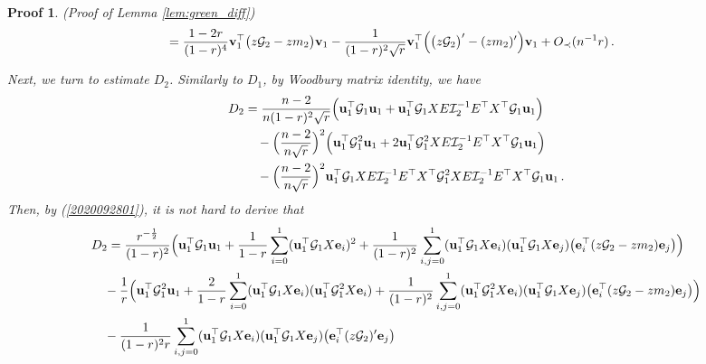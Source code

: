 \documentclass[12pt]{article}
\numberwithin{equation}{section}
\newtheorem{myPro}{Proof}
\theoremstyle{remark}
\newcommand{\1}{{\rm 1}\kern-0.24em{\rm I}}
\begin{document}
\begin{appendices}
\begin{myPro}{(Proof of Lemma \ref{lem:green_diff})}
\begin{align}
&=  \frac{1-2r}{(1-r)^4}{\bf v}_1^{\top} \big( z\mathcal{G}_2-zm_2\big){\bf v}_1
-\frac{1}{(1-r)^2\sqrt r}{\bf v}_1^{\top}\Big( \big(z\mathcal{G}_2\big)' - (zm_2)'\Big){\bf v}_1+O_\prec(n^{-1}r)\,.
\end{align}
%

Next, we turn to estimate $D_2$. Similarly to $D_1$, by Woodbury matrix identity, we have
\begin{align*}
D_2&= \frac{n-2}{n(1-r)^2\sqrt r} \Big( {\bf u}_1^{\top} \mathcal{G}_1 {\bf u}_1 + {\bf u}_1^{\top}  \mathcal{G}_1{X}{E} \mathcal{I}_2^{-1}{E}^{\top} {X}^{\top} \mathcal{G}_1 {\bf u}_1\Big) \notag\\
&\quad -\Big(\frac{n-2}{n\sqrt r}\Big)^2  \Big( {\bf u}_1^{\top}  \mathcal{G}_1^2{\bf u}_1 + 2{\bf u}_1^{\top}  \mathcal{G}_1^2{X}{E} \mathcal{I}_2^{-1}{E}^{\top} {X}^{\top} \mathcal{G}_1{\bf u}_1\Big) \notag\\
&\quad - \Big(\frac{n-2}{n\sqrt r}\Big)^2 {\bf u}_1^{\top} \mathcal{G}_1{X}{E} \mathcal{I}_2^{-1}{E}^{\top} {X}^{\top} \mathcal{G}_1^2 {X}{E} \mathcal{I}_2^{-1}{E}^{\top} {X}^{\top} \mathcal{G}_1{\bf u}_1\,.
\end{align*}
Then, by  (\ref{2020092801}), it is not hard to derive that {\small
\begin{align}\label{est:D_2}
&D_2= \frac{r^{-\frac 12}}{(1-r)^2} \Big( {\bf u}_1^{\top}\mathcal{G}_1{\bf u}_1 + \frac{1}{1-r} \sum_{i=0}^1  ({\bf u}_1^{\top}\mathcal{G}_1{X}{\bf e}_i) ^2 + \frac{1}{(1-r)^2} \sum_{i,j=0}^1  ({\bf u}_1^{\top}\mathcal{G}_1{X}{\bf e}_i) ({\bf u}_1^{\top}\mathcal{G}_1{X}{\bf e}_j)\big({\bf e}_i^{\top}(z\mathcal{G}_2-zm_2){\bf e}_j\big)\Big) \notag\\
&\quad - \frac 1r\Big( {\bf u}_1^{\top}\mathcal{G}_1^2{\bf u}_1 +  \frac{2}{1-r} \sum_{i=0}^1  ({\bf u}_1^{\top}\mathcal{G}_1{X}{\bf e}_i) ({\bf u}_1^{\top}\mathcal{G}_1^2{X}{\bf e}_i)+ \frac{1}{(1-r)^2} \sum_{i,j=0}^1  ({\bf u}_1^{\top}\mathcal{G}_1^2{X}{\bf e}_i) ({\bf u}_1^{\top}\mathcal{G}_1{X}{\bf e}_j)\big({\bf e}_i^{\top}(z\mathcal{G}_2-zm_2){\bf e}_j\big)\Big)\notag\\
&\quad -\frac{1}{(1-r)^2r} \sum_{i,j=0}^1  ({\bf u}_1^{\top}\mathcal{G}_1{X}{\bf e}_i) ({\bf u}_1^{\top}\mathcal{G}_1{X}{\bf e}_j)\big({\bf e}_i^{\top}(z\mathcal{G}_2)'{\bf e}_j\big)\notag\\

\end{align}}
\end{myPro}
\end{appendices}
\end{document}
